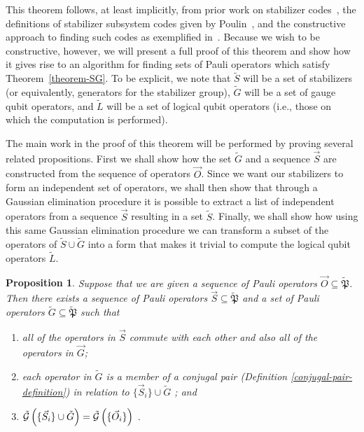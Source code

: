 \documentclass[twocolumn,showpacs,preprintnumbers,amsmath,amssymb,nofootinbib,pra,floatfix]{revtex4-1}
\newtheorem{proposition}{Proposition}
\newenvironment{remark}[1][Remark]{\begin{trivlist}
\item[\hskip \labelsep {\bfseries #1}]}{\end{trivlist}}
\newcommand{\lst}{\vec}
\newcommand{\set}{\tilde}
\newcommand{\genfun}{\tilde{\mathcal{G}}}
\newcommand{\pauligroup}{{\set{\mathfrak{P}}}}
\begin{document}
\begin{remark}
This theorem follows, at least implicitly, from prior work on stabilizer codes~\cite{Gottesman:97a}, the definitions of stabilizer subsystem codes given by Poulin~\cite{Poulin:05a}, and the constructive approach to finding such codes as exemplified in~\cite{Bacon:06a}.  Because we wish to be constructive, however, we will present a full proof of this theorem and show how it gives rise to an algorithm for finding sets of Pauli operators which satisfy Theorem~\ref{theorem-SG}.  To be explicit, we note that $\set S$ will be a set of stabilizers (or equivalently, generators for the stabilizer group), $\set G$ will be a set of gauge qubit operators, and $\set L$ will be a set of logical qubit operators (i.e., those on which the computation is performed).

The main work in the proof of this theorem will be performed by proving several related propositions.  First we shall show how the set $\set G$ and a sequence $\lst S$ are constructed from the sequence of operators $\lst O$.  Since we want our stabilizers to form an independent set of operators, we shall then show that through a Gaussian elimination procedure it is possible to extract a list of independent operators from a sequence $\lst S$ resulting in a set $\set S$.  Finally, we shall show how using this same Gaussian elimination procedure we can transform a subset of the operators of $\set S\cup\set G$ into a form that makes it trivial to compute the logical qubit operators $\set L$.
\end{remark}
\begin{proposition} \label{proposition-SG} Suppose that we are given a sequence of Pauli operators $\lst O\subseteq \pauligroup$.  Then there exists a sequence of Pauli operators $\lst S\subseteq\pauligroup$ and a set of Pauli operators $\set G\subseteq\pauligroup$ such that
\begin{enumerate}
\item all of the operators in $\lst S$ commute with each other and also all of the operators in $\lst G$; \label{stabs-commute-with-G}
\item each operator in $\set G$ is a member of a \emph{conjugal pair} (Definition \ref{conjugal-pair-definition}) in relation to $\{\lst S_i\} \cup \set G $ \label{conjugal-pairs-commute-with-SAG}; and
\item $\genfun\paren{\{\lst S_i\}\cup \set G}=\genfun\paren{\{\lst O_i\}}$ \label{SAG-spans-all}.
\end{enumerate}
\end{proposition}
\end{document}
